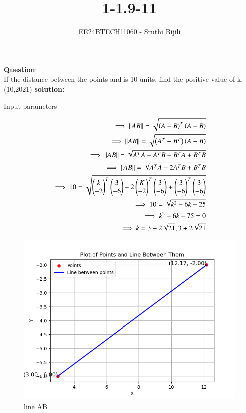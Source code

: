 \documentclass[journal]{IEEEtran}
\begin{document}

\vspace{3cm}

\title{1-1.9-11}
\author{EE24BTECH11060 - Sruthi Bijili}
{\let\newpage\relax\maketitle}

\renewcommand{\thefigure}{\theenumi}
\renewcommand{\thetable}{\theenumi}
\setlength{\intextsep}{10pt} %


\renewcommand{\thetable}{\theenumi}

\textbf{Question}:\\
If the distance between the points  and  is 10 units, find the positive
value of k.
\hfill(10,2021)
\textbf{solution:}
\begin{table}[h!]    
  \centering
  
  \caption{Input parameters}
\end{table}
\begin{align}
   \implies \left\vert\left\vert AB\right\vert\right\vert=\sqrt{\left(A-B\right)^T\left(A-B\right)}\\
   \implies \left\vert\left\vert AB\right\vert\right\vert=\sqrt{\left(A^T-B^T\right)\left(A-B\right)}\\
   \implies \left\vert\left\vert AB\right\vert\right\vert=\sqrt{A^TA-A^TB-B^TA+B^TB}\\
   \implies \left\vert\left\vert AB\right\vert\right\vert=\sqrt{A^TA-2A^TB+B^TB}\\
   \implies 10 =\sqrt{\begin{pmatrix}k \\ -2\end{pmatrix}^T\begin{pmatrix}3 \\-6\end{pmatrix}-2\begin{pmatrix}K \\-2\end{pmatrix}^T\begin{pmatrix}3\\-6\end{pmatrix}+\begin{pmatrix}3\\-6\end{pmatrix}^T\begin{pmatrix}3\\-6\end{pmatrix}}\\
   \implies 10 =\sqrt{k^2-6k+25}\\
   \implies k^2-6k-75=0\\
   \implies k=3-2\sqrt{21},3+2\sqrt{21}
\end{align}
\begin{figure}[h!]
   \centering
   \includegraphics[width=0.7\linewidth]{figs/fig1.png}
   \caption{line AB}
\end{figure}
\end{document}
